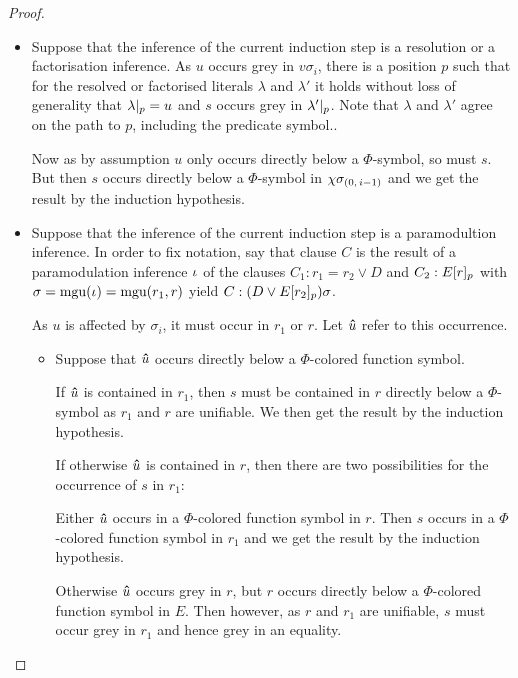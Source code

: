 \documentclass[,%
	draft=false,%
	numbers=noendperiod
	12pt,
	a4paper,
	oneside,%
	openany,
]{memoir}
\newcommand{\inv}{\ensuremath{\chi}}
\begin{document}
\begin{proof}
\begin{itemize}
\begin{itemize}
					\begin{itemize}
						\item
							Suppose that the inference of the current induction step is a resolution or a factorisation inference.
							As $u$ occurs grey in $v\sigma_i$, there is a position $p$ such that for the resolved or factorised literals $\lambda$ and $\lambda'$ it holds without loss of generality that $\lambda|_{p} = u$ and $s$ occurs grey in $\lambda'|_{p}$.
							Note that $\lambda$ and $\lambda'$ agree on the path to $p$, including the predicate symbol..

							Now as by assumption $u$ only occurs directly below a $\Phi$-symbol, so must $s$.
							But then $s$ occurs directly below a $\Phi$-symbol in $\inv\sigmazmi$ and we get the result by the induction hypothesis.

						\item
							Suppose that the inference of the current induction step is a paramodultion inference.
							In order to fix notation, say that clause $C$ is the result of a paramodulation inference\nolinebreak{} $\iota$ of the clauses $C_1: r_1=r_2 \lor D$ and $C_2: E{[r]_{p}}$ with $\sigma=\operatorname{mgu}(\iota)=\operatorname{mgu}(r_1, r)$ yield $C: (D\lor E{[r_2]_{p}})\sigma$.

							As $u$ is affected by $\sigma_i$, it must occur in $r_1$ or $r$. Let $\bm\hat u$ refer to this occurrence.

							\begin{itemize}
								\item
									Suppose that $\bm\hat u$ occurs directly below a $\Phi$-colored function symbol. 

									If $\bm\hat u$ is contained in $r_1$, then $s$ must be contained in $r$ directly below a $\Phi$-symbol as $r_1$ and $r$ are unifiable. We then get the result by the induction hypothesis.

									If otherwise $\bm\hat u$ is contained in $r$, 
									then there are two possibilities for the occurrence of $s$ in $r_1$:

									Either $\bm\hat u$ occurs in a $\Phi$-colored function symbol in $r$. Then $s$ occurs in a $\Phi$-colored function symbol in $r_1$ and we get the result by the induction hypothesis.

									Otherwise $\bm\hat u$ occurs grey in $r$, but $r$ occurs directly below a $\Phi$-colored function symbol in $E$.
									Then however, as $r$ and $r_1$ are unifiable, $s$ must occur grey in $r_1$ and hence grey in an equality.


\end{itemize}
\end{itemize}
\end{itemize}
\end{itemize}
\end{proof}
\end{document}
